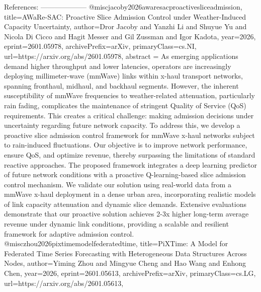         References:
        --------------------
        @misc{jacoby2026awaresacproactivesliceadmission,
      title={AWaRe-SAC: Proactive Slice Admission Control under Weather-Induced Capacity Uncertainty}, 
      author={Dror Jacoby and Yanzhi Li and Shuyue Yu and Nicola Di Cicco and Hagit Messer and Gil Zussman and Igor Kadota},
      year={2026},
      eprint={2601.05978},
      archivePrefix={arXiv},
      primaryClass={cs.NI},
      url={https://arxiv.org/abs/2601.05978},
      abstract = {As emerging applications demand higher throughput and lower latencies, operators are increasingly deploying millimeter-wave (mmWave) links within x-haul transport networks, spanning fronthaul, midhaul, and backhaul segments. However, the inherent susceptibility of mmWave frequencies to weather-related attenuation, particularly rain fading, complicates the maintenance of stringent Quality of Service (QoS) requirements. This creates a critical challenge: making admission decisions under uncertainty regarding future network capacity. To address this, we develop a proactive slice admission control framework for mmWave x-haul networks subject to rain-induced fluctuations. Our objective is to improve network performance, ensure QoS, and optimize revenue, thereby surpassing the limitations of standard reactive approaches. The proposed framework integrates a deep learning predictor of future network conditions with a proactive Q-learning-based slice admission control mechanism. We validate our solution using real-world data from a mmWave x-haul deployment in a dense urban area, incorporating realistic models of link capacity attenuation and dynamic slice demands. Extensive evaluations demonstrate that our proactive solution achieves 2-3x higher long-term average revenue under dynamic link conditions, providing a scalable and resilient framework for adaptive admission control.}
}@misc{zhou2026pixtimemodelfederatedtime,
      title={PiXTime: A Model for Federated Time Series Forecasting with Heterogeneous Data Structures Across Nodes}, 
      author={Yiming Zhou and Mingyue Cheng and Hao Wang and Enhong Chen},
      year={2026},
      eprint={2601.05613},
      archivePrefix={arXiv},
      primaryClass={cs.LG},
      url={https://arxiv.org/abs/2601.05613},
}
